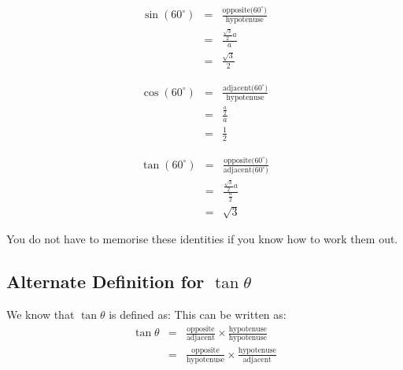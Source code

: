\begin{minipage}{0.5\textwidth}
\begin{flushright}

\begin{eqnarray*}
\sin(60^\circ)&=&\frac{\mbox{opposite($60^\circ$)}}{\mbox{hypotenuse}}\\
&=&\frac{\frac{\sqrt{3}}{2}a}{a}\\
&=&\frac{\sqrt{3}}{2}
\end{eqnarray*}

\begin{eqnarray*}
\cos(60^\circ)&=&\frac{\mbox{adjacent($60^\circ$)}}{\mbox{hypotenuse}}\\
&=&\frac{\frac{a}{2}}{a}\\
&=&\frac{1}{2}
\end{eqnarray*}

\begin{eqnarray*}
\tan(60^\circ)&=&\frac{\mbox{opposite($60^\circ$)}}{\mbox{adjacent($60^\circ$)}}\\
&=&\frac{\frac{\sqrt{3}}{2}a}{\frac{a}{2}}\\
&=&\sqrt{3}
\end{eqnarray*}
\end{flushright}
\end{minipage}

You do not have to memorise these identities if you know how to work them out. 

\subsection{Alternate Definition for $\tan \theta$}

We know that $\tan \theta$ is defined as:
This can be written as:
\begin{eqnarray*}
\tan \theta&=&\frac{\mbox{opposite}}{\mbox{adjacent}} \times \frac{\mbox{hypotenuse}}{\mbox{hypotenuse}}\\
&=&\frac{\mbox{opposite}}{\mbox{hypotenuse}} \times \frac{\mbox{hypotenuse}}{\mbox{adjacent}}
\end{eqnarray*}

